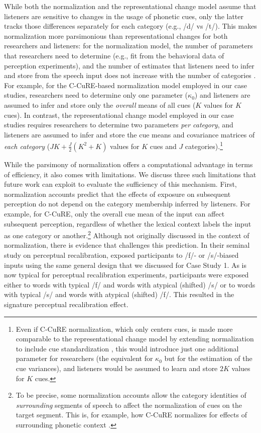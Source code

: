 \documentclass[
  11pt,
  man,floatsintext]{apa6}
\begin{document}
While both the normalization and the representational change model assume that listeners are sensitive to changes in the usage of phonetic cues, only the latter tracks those differences separately for each category (e.g., /d/ vs /t/). This makes normalization more parsimonious than representational changes for both researchers and listeners: for the normalization model, the number of parameters that researchers need to determine (e.g., fit from the behavioral data of perception experiments), and the number of estimates that listeners need to infer and store from the speech input does not increase with the number of categories \autocite[for related discussion, see also][]{apfelbaum-mcmurray2015}. For example, for the C-CuRE-based normalization model employed in our case studies, researchers need to determine only one parameter (\(\kappa_0\)) and listeners are assumed to infer and store only the \emph{overall} means of all cues (\(K\) values for \(K\) cues). In contrast, the representational change model employed in our case studies requires researchers to determine two parameters \emph{per category}, and listeners are assumed to infer and store the cue means and covariance matrices of \emph{each category} (\(JK + \frac{J}{2}(K^2+K)\) values for \(K\) cues and \(J\) categories).\footnote{Even if C-CuRE normalization, which only centers cues, is made more comparable to the representational change model by extending normalization to include cue standardization \autocite[also known as z-scoring, as used in, e.g., Lobanov normalization,][]{lobanov1971}, this would introduce just one additional parameter for researchers (the equivalent for \(\kappa_0\) but for the estimation of the cue variances), and listeners would be assumed to learn and store \(2K\) values for \(K\) cues.}

While the parsimony of normalization offers a computational advantage in terms of efficiency, it also comes with limitations. We discuss three such limitations that future work can exploit to evaluate the sufficiency of this mechanism. First, normalization accounts predict that the effects of exposure on subsequent perception do not depend on the category membership inferred by listeners. For example, for C-CuRE, only the overall cue mean of the input can affect subsequent perception, regardless of whether the lexical context labels the input as one category or another.\footnote{To be precise, some normalization accounts allow the category identities of \emph{surrounding} segments of speech to affect the normalization of cues on the target segment. This is, for example, how C-CuRE normalizes for effects of surrounding phonetic context \autocite{mcmurray-jongman2011}.} Although not originally discussed in the context of normalization, there is evidence that challenges this prediction. In their seminal study on perceptual recalibration, \textcite{norris2003} exposed participants to /f/- or /s/-biased inputs using the same general design that we discussed for Case Study 1. As is now typical for perceptual recalibration experiments, participants were exposed either to words with typical /f/ and words with atypical (shifted) /s/ or to words with typical /s/ and words with atypical (shifted) /f/. This resulted in the signature perceptual recalibration effect.
\end{document}
